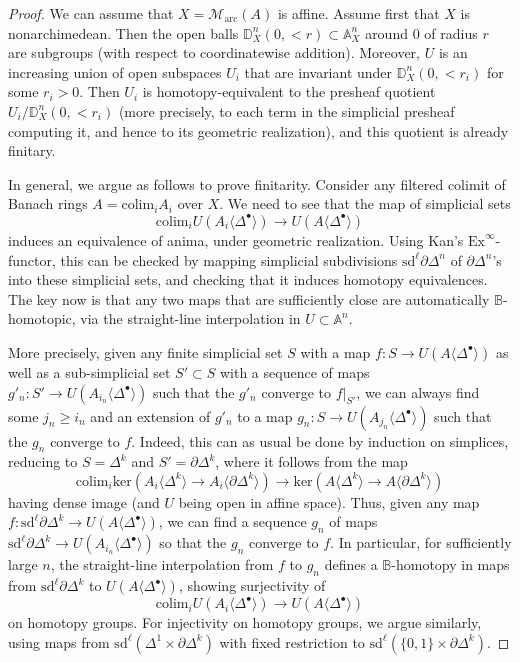 \documentclass[11pt]{amsart}
\numberwithin{equation}{section}
\numberwithin{theorem}{section}
\theoremstyle{definition}
\begin{document}
\begin{proof} We can assume that $X=\mathcal M_{\mathrm{arc}}(A)$ is affine. Assume first that $X$ is nonarchimedean. Then the open balls $\mathbb D^n_X(0,<r)\subset \mathbb A^n_X$ around $0$ of radius $r$ are subgroups (with respect to coordinatewise addition). Moreover, $U$ is an increasing union of open subspaces $U_i$ that are invariant under $\mathbb D^n_X(0,<r_i)$ for some $r_i>0$. Then $U_i$ is homotopy-equivalent to the presheaf quotient $U_i/\mathbb D^n_X(0,<r_i)$ (more precisely, to each term in the simplicial presheaf computing it, and hence to its geometric realization), and this quotient is already finitary.

In general, we argue as follows to prove finitarity. Consider any filtered colimit of Banach rings $A=\mathrm{colim}_i A_i$ over $X$. We need to see that the map of simplicial sets
\[
\mathrm{colim}_i U(A_i\langle\Delta^\bullet\rangle)\to U(A\langle\Delta^\bullet\rangle)
\]
induces an equivalence of anima, under geometric realization. Using Kan's $\mathrm{Ex}^\infty$-functor, this can be checked by mapping simplicial subdivisions $\mathrm{sd}^\ell \partial\Delta^n$ of $\partial\Delta^n$'s into these simplicial sets, and checking that it induces homotopy equivalences. The key now is that any two maps that are sufficiently close are automatically $\mathbb B$-homotopic, via the straight-line interpolation in $U\subset \mathbb A^n$.

More precisely, given any finite simplicial set $S$ with a map $f: S\to U(A\langle \Delta^\bullet\rangle)$ as well as a sub-simplicial set $S'\subset S$ with a sequence of maps $g'_n: S'\to U(A_{i_n}\langle\Delta^\bullet\rangle)$ such that the $g'_n$ converge to $f|_{S'}$, we can always find some $j_n\geq i_n$ and an extension of $g'_n$ to a map $g_n: S\to U(A_{j_n}\langle\Delta^\bullet\rangle)$ such that the $g_n$ converge to $f$. Indeed, this can as usual be done by induction on simplices, reducing to $S=\Delta^k$ and $S'=\partial\Delta^k$, where it follows from the map
\[
\mathrm{colim}_i \mathrm{ker}(A_i\langle\Delta^k\rangle\to A_i\langle\partial\Delta^k\rangle)\to \mathrm{ker}(A\langle\Delta^k\rangle\to A\langle\partial\Delta^k\rangle)
\]
having dense image (and $U$ being open in affine space). Thus, given any map $f: \mathrm{sd}^\ell\partial\Delta^k\to U(A\langle \Delta^\bullet\rangle)$, we can find a sequence $g_n$ of maps $\mathrm{sd}^\ell\partial\Delta^k\to U(A_{i_n}\langle\Delta^\bullet\rangle)$ so that the $g_n$ converge to $f$. In particular, for sufficiently large $n$, the straight-line interpolation from $f$ to $g_n$ defines a $\mathbb B$-homotopy in maps from $\mathrm{sd}^\ell\partial\Delta^k$ to $U(A\langle \Delta^\bullet\rangle)$, showing surjectivity of
\[
\mathrm{colim}_i U(A_i\langle\Delta^\bullet\rangle)\to U(A\langle\Delta^\bullet\rangle)
\]
on homotopy groups. For injectivity on homotopy groups, we argue similarly, using maps from $\mathrm{sd}^\ell(\Delta^1\times \partial\Delta^k)$ with fixed restriction to $\mathrm{sd}^\ell(\{0,1\}\times \partial\Delta^k)$.
\end{proof}
\end{document}
